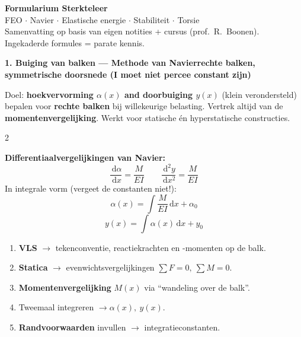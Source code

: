 \documentclass[10pt]{article}
\newcommand{\sectionbar}[2]{%
\vspace{3pt}%
\begin{tcolorbox}[colback=navy,colframe=navy,boxrule=0pt,arc=2pt,left=6pt,right=6pt,top=3pt,bottom=3pt]
\color{white}\large\bfseries #1\hfill{\normalsize\mdseries\color{white!75!navy}#2}
\end{tcolorbox}%
\vspace{1pt}}
\newcommand{\subhead}[1]{\vspace{2pt}{\color{navy}\bfseries #1}\par\vspace{1pt}}
\newcommand{\dd}{\,\mathrm{d}}
\begin{document}
\begin{tcolorbox}[colback=navy,colframe=navy,boxrule=0pt,arc=3pt,left=12pt,right=12pt,top=8pt,bottom=8pt]
\color{white}
{\Huge\bfseries Formularium Sterkteleer}\\[2pt]
{\large FEO $\cdot$ Navier $\cdot$ Elastische energie $\cdot$ Stabiliteit $\cdot$ Torsie}\\[1pt]
{\footnotesize\color{white!80!navy} Samenvatting op basis van eigen notities + cursus (prof.\ R.\ Boonen). Ingekaderde formules = parate kennis.}
\end{tcolorbox}
\vspace{2pt}

\sectionbar{1. Buiging van balken --- Methode van Navier}{rechte balken, symmetrische doorsnede (I moet niet percee constant zijn)}

Doel: \textbf{hoekvervorming $\alpha(x)$ and doorbuiging $y(x)$} (klein verondersteld) bepalen voor \textbf{rechte balken} bij willekeurige belasting. Vertrek altijd van de \textbf{momentenvergelijking}. Werkt voor statische én hyperstatische constructies.

\begin{multicols}{2}
\begin{key}
\textbf{Differentiaalvergelijkingen van Navier:}
\[ \frac{\dd\alpha}{\dd x}=\frac{M}{EI}\qquad \frac{\dd^{2}y}{\dd x^{2}}=\frac{M}{EI}\]
In integrale vorm (vergeet de constanten niet!):
\[ \alpha(x)=\int\frac{M}{EI}\dd x+\alpha_0\]
\[ y(x)=\int \alpha(x)\dd x+y_0\]
\end{key}

\columnbreak

\subhead{Stappenplan}
\begin{enumerate}[leftmargin=1.4em,itemsep=0pt,topsep=1pt]
\item \textbf{VLS} $\rightarrow$ tekenconventie, reactiekrachten en -momenten op de balk.
\item \textbf{Statica} $\rightarrow$ evenwichtsvergelijkingen $\sum F\!=\!0,\ \sum M\!=\!0$.
\item \textbf{Momentenvergelijking} $M(x)$ via ``wandeling over de balk''.
\item Tweemaal integreren $\rightarrow \alpha(x),\ y(x)$.
\item \textbf{Randvoorwaarden} invullen $\rightarrow$ integratieconstanten.
\end{enumerate}
\end{multicols}
\end{document}
